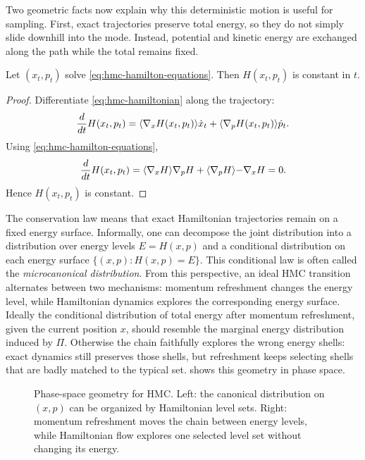 Two geometric facts now explain why this deterministic motion is useful for sampling.
First, exact trajectories preserve total energy, so they do not simply slide downhill into the mode.
Instead, potential and kinetic energy are exchanged along the path while the total remains fixed.

\begin{proposition}
\label{prop:hmc-energy-conservation}
Let $(x_t,p_t)$ solve \eqref{eq:hmc-hamilton-equations}.
Then $H(x_t,p_t)$ is constant in $t$.
\end{proposition}
\begin{proof}
Differentiate \eqref{eq:hmc-hamiltonian} along the trajectory:
\[
  \frac{d}{dt}H(x_t,p_t)
  =
  \langle\nabla_x H(x_t,p_t)\rangle{\dot x_t}
  +
  \langle\nabla_p H(x_t,p_t)\rangle{\dot p_t}.
\]
Using \eqref{eq:hmc-hamilton-equations},
\[
  \frac{d}{dt}H(x_t,p_t)
  =
  \langle\nabla_x H\rangle{\nabla_p H}
  +
  \langle\nabla_p H\rangle{-\nabla_x H}
  = 0.
\]
Hence $H(x_t,p_t)$ is constant.%
\end{proof}

The conservation law means that exact Hamiltonian trajectories remain on a fixed energy surface.
Informally, one can decompose the joint distribution into a distribution over energy levels $E=H(x,p)$ and a conditional distribution on each energy surface $\{(x,p):H(x,p)=E\}$.
This conditional law is often called the \emph{microcanonical distribution}.
From this perspective, an ideal HMC transition alternates between two mechanisms:
momentum refreshment changes the energy level, while Hamiltonian dynamics explores the corresponding energy surface.
Ideally the conditional distribution of total energy after momentum refreshment, given the current position \(x\), should resemble the marginal energy distribution induced by \(\Pi\).
Otherwise the chain faithfully explores the wrong energy shells: exact dynamics still preserves those shells, but refreshment keeps selecting shells that are badly matched to the typical set.
 shows this geometry in phase space.

\begin{figure}[H]
  \centering
  
  \caption{Phase-space geometry for HMC.
  Left: the canonical distribution on $(x,p)$ can be organized by Hamiltonian level sets.
  Right: momentum refreshment moves the chain between energy levels, while Hamiltonian flow explores one selected level set without changing its energy.}
  \label{fig:hmc-energy-shells}
\end{figure}

